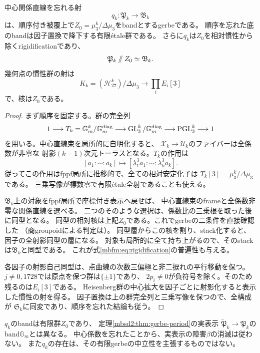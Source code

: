 \begin{proposition}[中心慣性によるrigidification]
\label{mbfm:prop:rigidification}
中心関係直線を忘れる射
\[
 q_k:\mathfrak P_k\longrightarrow\mathfrak B_k
\]
は、順序付き被覆上で$Z_0=\mu_3^k/\Delta\mu_3$をbandとするgerbeである。
順序を忘れた底のbandは因子置換で降下する有限\'etale群である。
さらに$q_k$は$Z_0$を相対慣性から除くrigidificationであり、
\begin{equation}\label{mbfm:eq:rigidification}
 \mathfrak P_k\mathbin{/\mkern-6mu/}Z_0\simeq\mathfrak B_k.
\end{equation}
幾何点の慣性群の射は
\[
 K_k=(\mathcal H_{27}^k)/\Delta\mu_3
 \longrightarrow\prod_i E_i[3]
\]
で、核は$Z_0$である。
\end{proposition}
\begin{proof}
まず順序を固定する。群の完全列
\[
 1\longrightarrow T_k=\mathbb G_m^k/\mathbb G_m^{\rm diag}
 \longrightarrow\operatorname{GL}_3^k/\mathbb G_m^{\rm diag}
 \longrightarrow\operatorname{PGL}_3^k\longrightarrow1
\]
を用いる。中心直線束を局所的に自明化すると、
$\mathcal X_k\to\mathcal U_k$のファイバーは全係数が非零な
射影$(k-1)$次元トーラスとなる。$T_k$の作用は
\[
 [a_1:\cdots:a_k]\longmapsto
 [\lambda_1^3a_1:\cdots:\lambda_k^3a_k].
\]
従ってこの作用はfppf局所に推移的で、全ての相対安定化子は
$T_k[3]=\mu_3^k/\Delta\mu_3$である。
三乗写像が標数零で有限\'etale全射であることも使える。

$\mathfrak B_k$上の対象をfppf局所で座標付き表示へ戻せば、
中心直線束のframeと全係数非零な関係直線を選べる。
二つのそのような選択は、係数比の三乗根を取った後に同型となる。
同型の相対核は上記$Z_0$である。これでgerbeの二条件を直接確認した
（商groupoidによる判定は\cite[Tag~06PD]{MBFMStacksGerbes}）。
同型層からこの核を割り、stack化すると、因子の全射影同型の層になる。
対象も局所的に全て持ち上がるので、そのstackは$\mathfrak B_k$と同型である。
これが式\eqref{mbfm:eq:rigidification}の普遍性も与える。

各因子の射影自己同型は、点曲線の次数三偏極と非二捩れの平行移動を保つ。
$j\ne0,1728$では原点を保つ群は$\{\pm1\}$であり、
$2p_i\ne0$が負符号を除く。そのため残るのは$E_i[3]$である。
Heisenberg群の中心拡大を因子ごとに射影化すると表示した慣性の射を得る。
因子置換は上の群完全列と三乗写像を保つので、全構成が
$\mathfrak S_k$に同変であり、順序を忘れた結論も従う。
\end{proof}

\begin{remark}[二種類のgerbe]
\label{mbfm:rem:two-gerbes}
$q_k$のbandは有限群$Z_0$であり、
定理\ref{mbsd2:thm:gerbe-period}の実表示
$\widetilde{\mathfrak P}_k\to\mathfrak P_k$のband$\mathbb G_m$とは異なる。
中心係数を忘れたことから、実表示の障害$\beta$の消滅は従わない。
また$q_k$の存在は、その有限gerbeの中立性を主張するものではない。
\end{remark}

